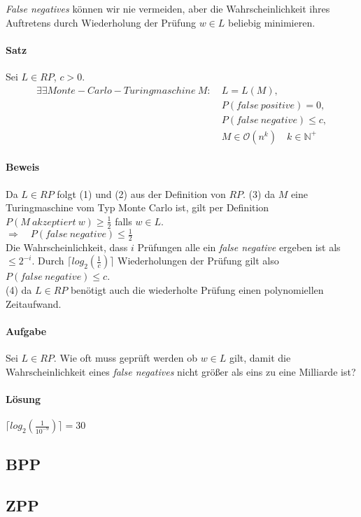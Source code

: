 \emph{False negatives} können wir nie vermeiden, aber die Wahrscheinlichkeit ihres Auftretens durch Wiederholung der Prüfung $w \in L$ beliebig minimieren.

\paragraph{Satz}
Sei $L \in RP$, $c > 0$.
\setcounter{equation}{0}
\begin{alignat}
	\exists \exists Monte-Carlo-Turingmaschine\ M:\ 
	& L = L(M), \\
	& P(false\ positive) = 0, \\
	& P(false\ negative) \leq c, \\
	& M \in \mathcal{O}(n^k) \quad k \in \mathbb{N}^+ 
\end{alignat}

\paragraph{Beweis}
Da $L \in RP$ folgt (1) und (2) aus der Definition von $RP$.
(3) da $M$ eine Turingmaschine vom Typ Monte Carlo ist, gilt per Definition $P(M\ akzeptiert\ w) \geq \frac{1}{2}$ falls $w \in L$. \\
$\Rightarrow \quad P(false\ negative) \leq \frac{1}{2}$ \\
Die Wahrscheinlichkeit, dass $i$ Prüfungen alle ein \emph{false negative} ergeben ist als $\leq 2^{-i}$. 
Durch $\lceil log_{2}(\frac{1}{c}) \rceil$ Wiederholungen der Prüfung gilt also $P(false\ negative) \leq c$. \\
(4) da $L \in RP$ benötigt auch die wiederholte Prüfung einen polynomiellen Zeitaufwand.

\paragraph{Aufgabe}
Sei $L \in RP$. Wie oft muss geprüft werden ob $w \in L$ gilt, damit die Wahrscheinlichkeit eines \emph{false negatives} nicht größer als eins zu eine Milliarde ist?

\paragraph{Lösung}
$\lceil log_{2}(\frac{1}{10^{-9}}) \rceil = 30$

\subsection{BPP}


\subsection{ZPP}